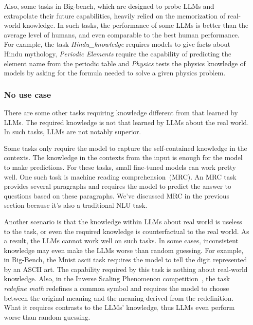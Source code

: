 \documentclass[manuscript,screen, nonacm]{acmart}
\begin{document}
Also, some tasks in Big-bench\cite{srivastava2022beyond}, which are designed to probe LLMs and extrapolate their future capabilities, heavily relied on the memorization of real-world knowledge. In such tasks, the performance of some LLMs is better than the average level of humans, and even comparable to the best human performance. For example, the task \textit{Hindu\_knowledge} requires models to give facts about Hindu mythology, \textit{Periodic Elements} require the capability of predicting the element name from the periodic table and \textit{Physics} tests the physics knowledge of models by asking for the formula needed to solve a given physics problem. 






\subsubsection{No use case}
There are some other tasks requiring knowledge different from that learned by LLMs. The required knowledge is not that learned by LLMs about the real world. In such tasks, LLMs are not notably superior.

Some tasks only require the model to capture the self-contained knowledge in the contexts. The knowledge in the contexts from the input is enough for the model to make predictions. For these tasks, small fine-tuned models can work pretty well. One such task is machine reading comprehension~(MRC). An MRC task provides several paragraphs and  requires the model to predict the answer to questions based on these paragraphs. We've discussed MRC in the previous section because it's also a traditional NLU task. 

Another scenario is that the knowledge within LLMs about real world is useless to the task, or even the required knowledge is counterfactual to the real world. As a result, the LLMs cannot work well on such tasks. In some cases, inconsistent knowledge may even make the LLMs worse than random guessing. For example, in Big-Bench, the Mnist ascii task requires the model to tell the digit represented by an ASCII art. The capability required by this task is nothing about real-world knowledge. Also, in the Inverse Scaling Phenomenon competition~\cite{mckenzie2022round2}, the task \textit{redefine math} redefines a common symbol and requires the model to choose between the original meaning and the meaning derived from the redefinition. What it requires contrasts to the LLMs' knowledge, thus LLMs even perform worse than random guessing.  
\end{document}
